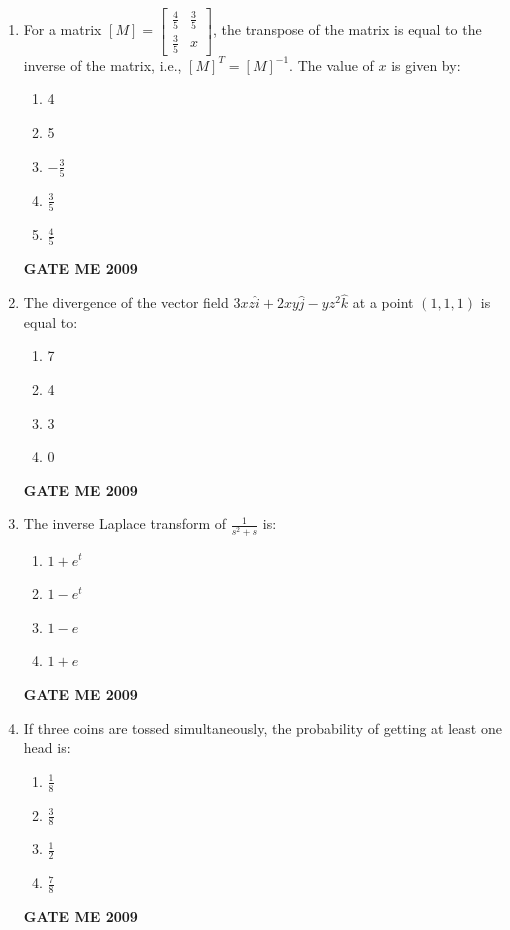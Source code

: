 \documentclass[journal]{IEEEtran}
\begin{document}
\begin{enumerate}[leftmargin=0pt]
    


        

\item For a matrix $[M]=\begin{bmatrix} \frac{4}{5} & \frac{3}{5} \\ \frac{3}{5} & x \end{bmatrix}$, the transpose of the matrix is equal to the inverse of the matrix, i.e., $[M]^T=[M]^{-1}$. The value of $x$ is given by:
  \begin{enumerate}[label=(\alph*)]
    \item 4
    \item 5
    \item $-\frac{3}{5}$
    \item $\frac{3}{5}$
    \item $\frac{4}{5}$
  \end{enumerate}
  \hfill{\textbf{GATE ME 2009}}


\item The divergence of the vector field $3 x z \hat{i} + 2 x y \hat{j} - y z^{2} \hat{k}$ at a point $(1,1,1)$ is equal to:
  \begin{enumerate}[label=(\alph*)]
    \item 7
    \item 4
    \item 3
    \item 0
  \end{enumerate}
  \hfill{\textbf{GATE ME 2009}}

\item The inverse Laplace transform of $\frac{1}{s^{2} + s}$ is:
  \begin{enumerate}[label=(\alph*)]
    \item $1 + e^{t}$
    \item $1 - e^{t}$
    \item $1 - e$
    \item $1 + e$
  \end{enumerate}
  \hfill{\textbf{GATE ME 2009}}

\item If three coins are tossed simultaneously, the probability of getting at least one head is:
  \begin{enumerate}[label=(\alph*)]
    \item $\frac{1}{8}$
    \item $\frac{3}{8}$
    \item $\frac{1}{2}$
    \item $\frac{7}{8}$
  \end{enumerate}
  \hfill{\textbf{GATE ME 2009}}



\end{enumerate}
\end{document}
